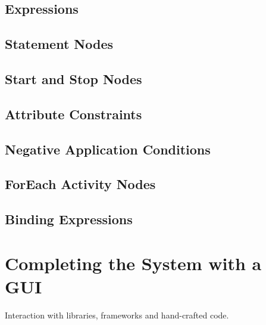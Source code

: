 \subsection*{Expressions}

\subsection*{Statement Nodes}

\subsection*{Start and Stop Nodes}

\subsection*{Attribute Constraints}

\subsection*{Negative Application Conditions}

\subsection*{ForEach Activity Nodes}

\subsection*{Binding Expressions}

\section{Completing the System with a GUI}

Interaction with libraries, frameworks and hand-crafted code.